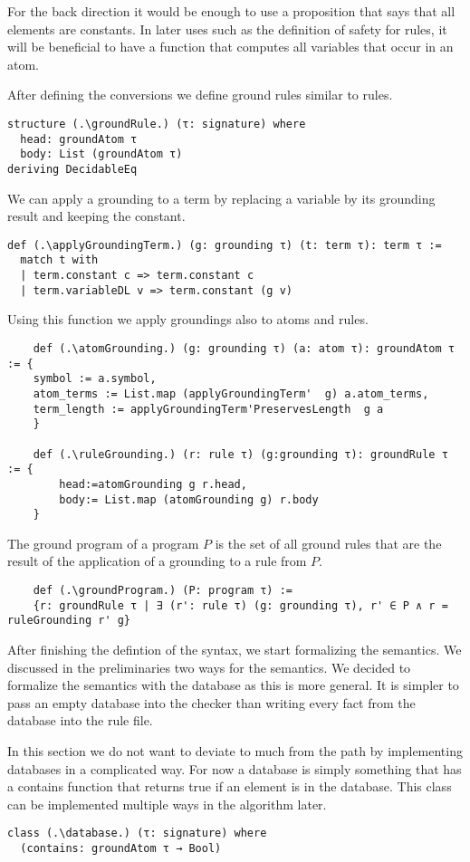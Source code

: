 For the back direction it would be enough to use a proposition that says that all elements are constants. In later uses such as the definition of safety for rules, it will be beneficial to have a function that computes all variables that occur in an atom. 



After defining the conversions we define ground rules similar to rules.

\begin{lstlisting}
structure (.\groundRule.) (τ: signature) where
  head: groundAtom τ
  body: List (groundAtom τ)
deriving DecidableEq
\end{lstlisting}

We can apply a grounding to a term by replacing a variable by its grounding result and keeping the constant.
\begin{lstlisting}
def (.\applyGroundingTerm.) (g: grounding τ) (t: term τ): term τ :=
  match t with
  | term.constant c => term.constant c
  | term.variableDL v => term.constant (g v)
\end{lstlisting}

Using this function we apply groundings also to atoms and rules. 

\begin{lstlisting}
    def (.\atomGrounding.) (g: grounding τ) (a: atom τ): groundAtom τ := {
    symbol := a.symbol, 
    atom_terms := List.map (applyGroundingTerm'  g) a.atom_terms, 
    term_length := applyGroundingTerm'PreservesLength  g a
    }

    def (.\ruleGrounding.) (r: rule τ) (g:grounding τ): groundRule τ := {
        head:=atomGrounding g r.head, 
        body:= List.map (atomGrounding g) r.body 
    }

\end{lstlisting}

The ground program of a program $P$ is the set of all ground rules that are the result of the application of a grounding to a rule from $P$.

\begin{lstlisting}
    def (.\groundProgram.) (P: program τ) := 
    {r: groundRule τ | ∃ (r': rule τ) (g: grounding τ), r' ∈ P ∧ r = ruleGrounding r' g}
\end{lstlisting}

After finishing the defintion of the syntax, we start formalizing the semantics. We discussed in the preliminaries two ways for the semantics. We decided to formalize the semantics with the database as this is more general. It is simpler to pass an empty database into the checker than writing every fact from the database into the rule file.

In this section we do not want to deviate to much from the path by implementing databases in a complicated way. For now a database is simply something that has a contains function that returns true if an element is in the database. This class can be implemented multiple ways in the algorithm later.

\begin{lstlisting}
class (.\database.) (τ: signature) where
  (contains: groundAtom τ → Bool)
\end{lstlisting}



